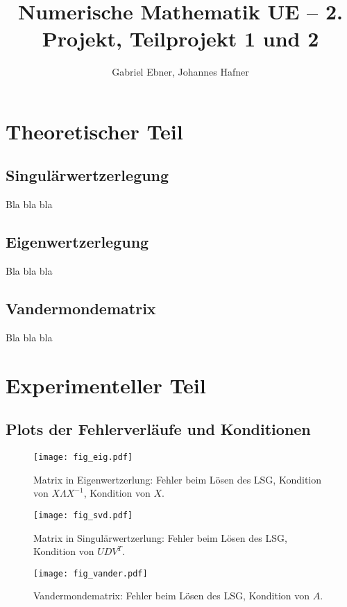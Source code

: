 \documentclass{scrartcl}
\begin{document}
\title{Numerische Mathematik UE -- 2. Projekt, Teilprojekt 1 und 2}
\author{Gabriel Ebner, Johannes Hafner}
\maketitle

\section{Theoretischer Teil}

\subsection{Singulärwertzerlegung}

Bla bla bla

\subsection{Eigenwertzerlegung}

Bla bla bla

\subsection{Vandermondematrix}

Bla bla bla

\section{Experimenteller Teil}

\subsection{Plots der Fehlerverläufe und Konditionen}

\begin{figure}[!htb]
\centering
\texttt{[image: fig\_eig.pdf]}
\caption{Matrix in Eigenwertzerlung: Fehler beim Lösen des LSG, Kondition von \(X \Lambda X^{-1}\), Kondition von \(X\). }
\label{fig:eig}
\end{figure}

\begin{figure}[!htb]
\centering
\texttt{[image: fig\_svd.pdf]}
\caption{Matrix in Singulärwertzerlung: Fehler beim Lösen des LSG, Kondition von \(UDV^T\). }
\label{fig:svd}
\end{figure}

\begin{figure}[!htb]
\centering
\texttt{[image: fig\_vander.pdf]}
\caption{Vandermondematrix: Fehler beim Lösen des LSG, Kondition von \(A\). }
\label{fig:svd}
\end{figure}
\end{document}

